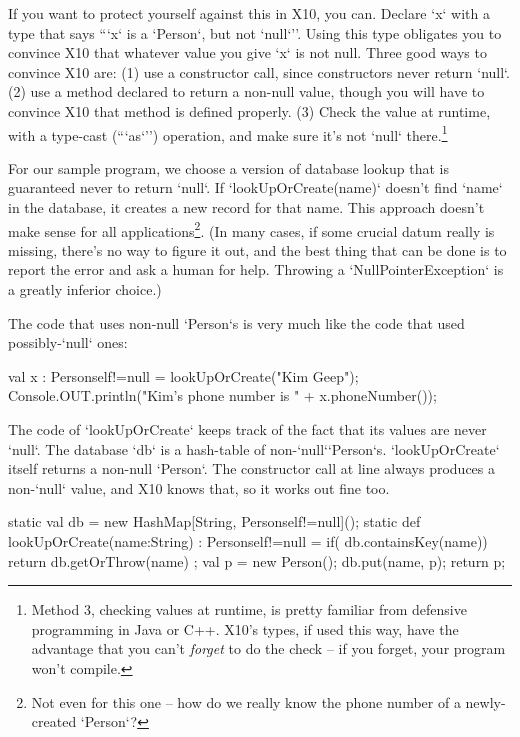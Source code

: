 If you want to protect yourself against this in X10, you can.  Declare \xcd`x`
with a type that says ``\xcd`x` is a \xcd`Person`, but not \xcd`null`''.  
Using this type obligates you to convince X10 that whatever value you give
\xcd`x` is not null.  Three good ways to convince X10 are: (1) use a
constructor call, since constructors never return \xcd`null`. 
(2) use a method declared to return a non-null value, though you will have to
convince X10 that method is defined properly. (3) Check the value at runtime,
with a type-cast (``\xcd`as`'') operation, 
and make sure it's not \xcd`null` there.\footnote{Method 3, checking values at
runtime, is pretty familiar from defensive programming in Java or C++.  X10's
types, if used this way, have the advantage that you can't {\em forget} to do
the check -- if you forget, your program won't compile.}

For our sample program, we choose a version of database lookup that is
guaranteed never to return \xcd`null`.  If \xcd`lookUpOrCreate(name)` doesn't
find \xcd`name` in the database, it creates a new record for that name.  This
approach doesn't make sense for all applications\footnote{Not even for this
one -- how do we really know the phone number of a newly-created
\xcd`Person`?}.  (In many cases, if some crucial datum really is missing,
there's no way to figure it out, and the best thing that can be done is to
report the error and ask a human for help.  Throwing a
\xcd`NullPointerException` is a greatly inferior choice.)

The code that uses non-null \xcd`Person`s is very much like the code that used
possibly-\xcd`null` ones: 
\begin{xtennum}[]
val x : Person{self!=null} = lookUpOrCreate("Kim Geep");
Console.OUT.println("Kim's phone number is " + x.phoneNumber());
\end{xtennum}

The code of \xcd`lookUpOrCreate` keeps track of the fact that its values are
never \xcd`null`.  The database \xcd`db` is a hash-table of
non-\xcd`null`\xcd`Person`s.  \xcd`lookUpOrCreate` itself returns a non-null
\xcd`Person`.  The constructor call at line 
always produces a non-\xcd`null` value, and X10 knows that, so it works out
fine too.
\begin{xtennum}[]
static val db = new HashMap[String, Person{self!=null}]();
static def lookUpOrCreate(name:String) : Person{self!=null} = {
  if( db.containsKey(name)) {
     return db.getOrThrow(name) ;
  }
  val p = new Person(); 
  db.put(name, p);
  return p;
}
\end{xtennum}




